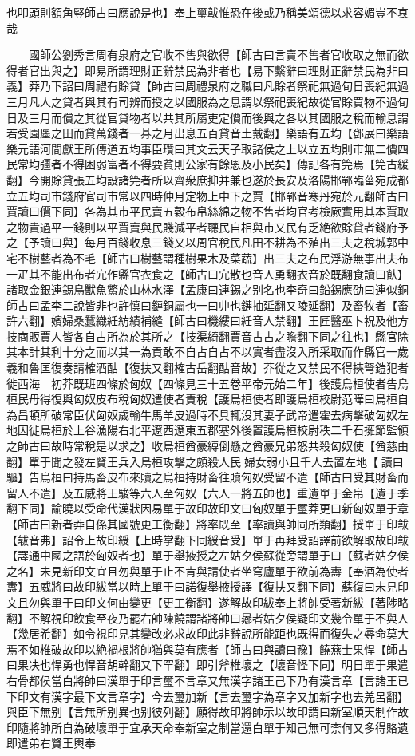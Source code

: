 也叩頭則額角竪師古曰應說是也】奉上璽韍惟恐在後或乃稱美頌德以求容媚豈不哀哉

　　國師公劉秀言周有泉府之官收不售與欲得【師古曰言賣不售者官收取之無而欲得者官出與之】即易所謂理財正辭禁民為非者也【易下繫辭曰理財正辭禁民為非曰義】莽乃下詔曰周禮有賖貸【師古曰周禮泉府之職曰凡賖者祭祀無過旬日喪紀無過三月凡人之貸者與其有司辨而授之以國服為之息謂以祭祀喪紀故從官賖買物不過旬日及三月而償之其從官貸物者以共其所屬吏定價而後與之各以其國服之稅而輸息謂若受園㕓之田而貸萬錢者一朞之月出息五百貸音土戴翻】樂語有五均【鄧展曰樂語樂元語河間獻王所傳道五均事臣瓚曰其文云天子取諸侯之上以立五均則市無二價四民常均彊者不得困弱富者不得要貧則公家有餘恩及小民矣】傳記各有筦焉【筦古緩翻】今開賖貸張五均設諸筦者所以齊衆庶抑并兼也遂於長安及洛陽邯鄲臨菑宛成都立五均司市錢府官司市常以四時仲月定物上中下之賈【邯鄲音寒丹宛於元翻師古曰賈讀曰價下同】各為其市平民賣五穀布帛絲綿之物不售者均官考檢厥實用其本賈取之物貴過平一錢則以平賈賣與民賤減平者聽民自相與市又民有乏絶欲賖貸者錢府予之【予讀曰與】每月百錢收息三錢又以周官稅民凡田不耕為不殖出三夫之稅城郭中宅不樹藝者為不毛【師古曰樹藝謂種樹果木及菜蔬】出三夫之布民浮游無事出夫布一疋其不能出布者宂作縣官衣食之【師古曰宂散也音人勇翻衣音於既翻食讀曰飤】諸取金銀連錫鳥獸魚鱉於山林水澤【孟康曰連錫之别名也李奇曰鉛錫應劭曰連似銅師古曰孟李二說皆非也許慎曰鏈銅屬也一曰丱也鏈抽延翻又陵延翻】及畜牧者【畜許六翻】嬪婦桑蠶織紝紡績補縫【師古曰機縷曰紝音人禁翻】王匠醫巫卜祝及他方技商販賈人皆各自占所為於其所之【技渠綺翻賈音古占之瞻翻下同之往也】縣官除其本計其利十分之而以其一為貢敢不自占自占不以實者盡沒入所采取而作縣官一歲羲和魯匡復奏請榷酒酤【復扶又翻榷古岳翻酤音故】莽從之又禁民不得挾弩鎧犯者徙西海　初莽既班四條於匈奴【四條見三十五卷平帝元始二年】後護烏桓使者告烏桓民毋得復與匈奴皮布稅匈奴遣使者責稅【護烏桓使者即護烏桓校尉范曄曰烏桓自為昌頓所破常臣伏匈奴歲輸牛馬羊皮過時不具輒沒其妻子武帝遣霍去病擊破匈奴左地因徙烏桓於上谷漁陽右北平遼西遼東五郡塞外後置護烏桓校尉秩二千石擁節監領之師古曰故時常稅是以求之】收烏桓酋豪縛倒懸之酋豪兄弟怒共殺匈奴使【酋慈由翻】單于聞之發左賢王兵入烏桓攻擊之頗殺人民婦女弱小且千人去置左地【讀曰驅】告烏桓曰持馬畜皮布來贖之烏桓持財畜往贖匈奴受留不遣【師古曰受其財畜而留人不遣】及五威將王駿等六人至匈奴【六人一將五帥也】重遺單于金帛【遺于季翻下同】諭曉以受命代漢狀因易單于故印故印文曰匈奴單于璽莽更曰新匈奴單于章【師古曰新者莽自係其國號更工衡翻】將率既至【率讀與帥同所類翻】授單于印韍【韍音弗】詔令上故印綬【上時掌翻下同綬音受】單于再拜受詔譯前欲解取故印韍【譯通中國之語於匈奴者也】單于舉掖授之左姑夕侯蘇從旁謂單于曰【蘇者姑夕侯之名】未見新印文宜且勿與單于止不肯與請使者坐穹廬單于欲前為夀【奉酒為使者夀】五威將曰故印紱當以時上單于曰諾復舉掖授譯【復扶又翻下同】蘇復曰未見印文且勿與單于曰印文何由變更【更工衡翻】遂解故印紱奉上將帥受著新紱【著陟略翻】不解視印飲食至夜乃罷右帥陳饒謂諸將帥曰曏者姑夕侯疑印文幾令單于不與人【幾居希翻】如令視印見其變改必求故印此非辭說所能距也既得而復失之辱命莫大焉不如椎破故印以絶禍根將帥猶與莫有應者【師古曰與讀曰豫】饒燕士果悍【師古曰果决也悍勇也悍音胡幹翻又下罕翻】即引斧椎壞之【壞音怪下同】明日單于果遣右骨都侯當白將帥曰漢單于印言璽不言章又無漢字諸王己下乃有漢言章【言諸王已下印文有漢字最下文言章字】今去璽加新【言去璽字為章字又加新字也去羌呂翻】與臣下無别【言無所别異也别彼列翻】願得故印將帥示以故印謂曰新室順天制作故印隨將帥所自為破壞單于宜承天命奉新室之制當還白單于知己無可柰何又多得賂遺即遣弟右賢王輿奉